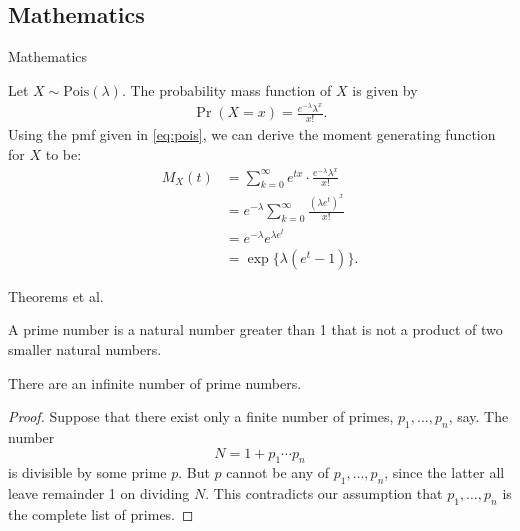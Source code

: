\documentclass[,]{beamer}
\begin{document}
\hypertarget{mathematics}{%
\subsection{Mathematics}\label{mathematics}}

\begin{frame}{Mathematics}
\protect\hypertarget{mathematics-1}{}

Let \(X\sim\mathrm{Pois}(\lambda)\). The probability mass function of
\(X\) is given by \begin{align}\label{eq:pois}
    \Pr(X=x) = \frac{e^{-\lambda}\lambda^x}{x!}.
\end{align} Using the pmf given in \eqref{eq:pois}, we can derive the
moment generating function for \(X\) to be: \begin{align*}
    M_X(t) 
    &= \sum_{k=0}^\infty e^{tx} \cdot \frac{e^{-\lambda}\lambda^x}{x!} \\
    &= e^{-\lambda} \sum_{k=0}^\infty  \frac{(\lambda e^t)^x}{x!} \\
    &= e^{-\lambda}  e^{\lambda e^t} \\
    &= \exp\{\lambda(e^t - 1) \}.
\end{align*}

\end{frame}

\begin{frame}{Theorems et al.}
\protect\hypertarget{theorems-et-al.}{}

\begin{definition}
    A prime number is a natural number greater than 1 that is not a product of two smaller natural numbers.
\end{definition}

\begin{theorem}
    There are an infinite number of prime numbers.
\end{theorem}

\begin{proof}
    Suppose that there exist only a finite number of primes, $p_1,\dots,p_n$, say.
    The number 
    \[
      N = 1+p_1\cdots p_n
    \]
    is divisible by some prime $p$.
    But $p$ cannot be any of $p_1,\dots,p_n$, since the latter all leave remainder 1 on dividing $N$.
    This contradicts our assumption that $p_1,\dots,p_n$ is the complete list of primes.
\end{proof}

\end{frame}
\end{document}
